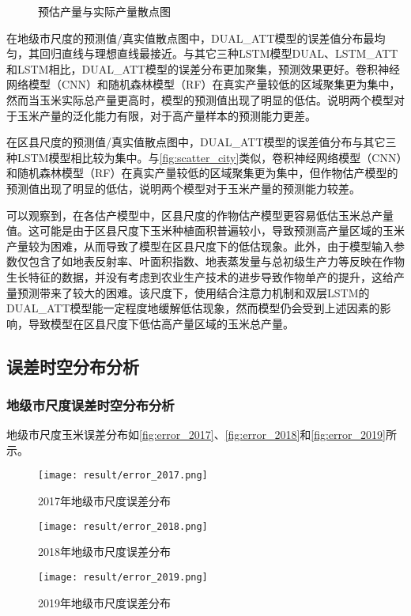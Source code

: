 \begin{figure}
  \centering
  \hfill
  \caption{预估产量与实际产量散点图}
\end{figure}

\par 在地级市尺度的预测值/真实值散点图中，DUAL\_ATT模型的误差值分布最均匀，其回归直线与理想直线最接近。与其它三种LSTM模型DUAL、LSTM\_ATT和LSTM相比，DUAL\_ATT模型的误差分布更加聚集，预测效果更好。卷积神经网络模型（CNN）和随机森林模型（RF）在真实产量较低的区域聚集更为集中，然而当玉米实际总产量更高时，模型的预测值出现了明显的低估。说明两个模型对于玉米产量的泛化能力有限，对于高产量样本的预测能力更差。

\par 在区县尺度的预测值/真实值散点图中，DUAL\_ATT模型的误差值分布与其它三种LSTM模型相比较为集中。与\autoref{fig:scatter_city}类似，卷积神经网络模型（CNN）和随机森林模型（RF）在真实产量较低的区域聚集更为集中，但作物估产模型的预测值出现了明显的低估，说明两个模型对于玉米产量的预测能力较差。

\par 可以观察到，在各估产模型中，区县尺度的作物估产模型更容易低估玉米总产量值。这可能是由于区县尺度下玉米种植面积普遍较小，导致预测高产量区域的玉米产量较为困难，从而导致了模型在区县尺度下的低估现象。此外，由于模型输入参数仅包含了如地表反射率、叶面积指数、地表蒸发量与总初级生产力等反映在作物生长特征的数据，并没有考虑到农业生产技术的进步导致作物单产的提升，这给产量预测带来了较大的困难。该尺度下，使用结合注意力机制和双层LSTM的DUAL\_ATT模型能一定程度地缓解低估现象，然而模型仍会受到上述因素的影响，导致模型在区县尺度下低估高产量区域的玉米总产量。

\subsection{误差时空分布分析}
\subsubsection{地级市尺度误差时空分布分析}
\par 地级市尺度玉米误差分布如\autoref{fig:error_2017}、\autoref{fig:error_2018}和\autoref{fig:error_2019}所示。

\begin{figure}
  \centering
  \texttt{[image: result/error\_2017.png]}
  \caption{2017年地级市尺度误差分布}
  \label{fig:error_2017}
\end{figure}
\begin{figure}
  \centering
  \texttt{[image: result/error\_2018.png]}
  \caption{2018年地级市尺度误差分布}
  \label{fig:error_2018}
\end{figure}
\begin{figure}
  \centering
  \texttt{[image: result/error\_2019.png]}
  \caption{2019年地级市尺度误差分布}
  \label{fig:error_2019}
\end{figure}


